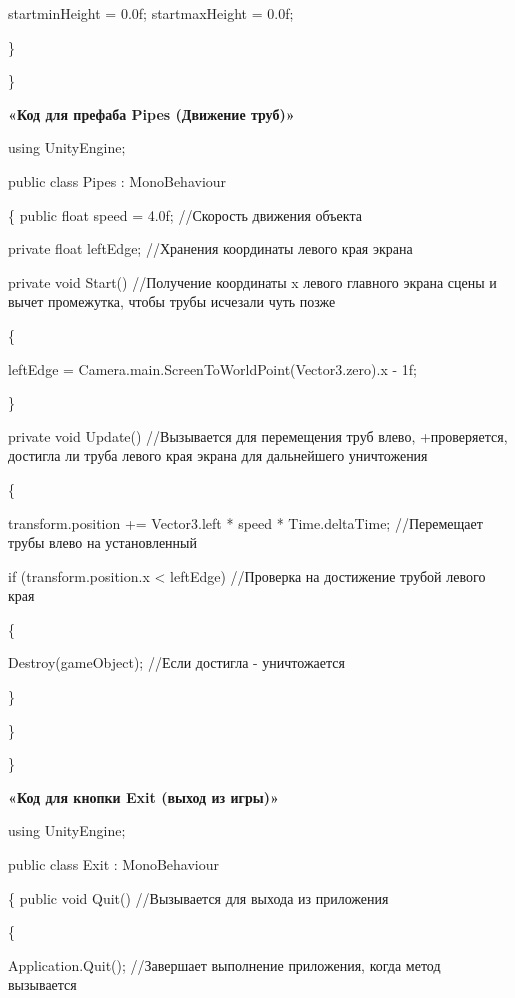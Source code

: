 \documentclass[14pt, oneside]{altsu-report}
\begin{document}
        startminHeight = 0.0f;
        startmaxHeight = 0.0f;
        
    \}

\}


\begin{center}
\label{code:appendix}\textbf{«Код для префаба Pipes (Движение труб)»} 
\end{center}

using UnityEngine;

public class Pipes : MonoBehaviour

\{
    public float speed = 4.0f; //Скорость движения объекта

    private float leftEdge; //Хранения координаты левого края экрана

    private void Start() //Получение координаты x левого главного экрана сцены и вычет промежутка, чтобы трубы исчезали чуть позже 
    
    \{
    
        leftEdge = Camera.main.ScreenToWorldPoint(Vector3.zero).x - 1f;
        
    \}

    private void Update() //Вызывается для перемещения труб влево, +проверяется, достигла ли труба левого края экрана для дальнейшего уничтожения

    \{
    
        transform.position += Vector3.left * speed * Time.deltaTime; //Перемещает трубы влево на установленный 

        if (transform.position.x < leftEdge) //Проверка на достижение трубой левого края
        
        \{
        
            Destroy(gameObject); //Если достигла - уничтожается
            
        \}
        
    \}

\}


\begin{center}
\label{code:appendix}\textbf{«Код для кнопки Exit (выход из игры)»} 
\end{center} 

using UnityEngine;

public class Exit : MonoBehaviour

\{
    public void Quit() //Вызывается для выхода из приложения
    
    \{
    
        Application.Quit(); //Завершает выполнение приложения, когда метод вызывается
        
\end{document}
